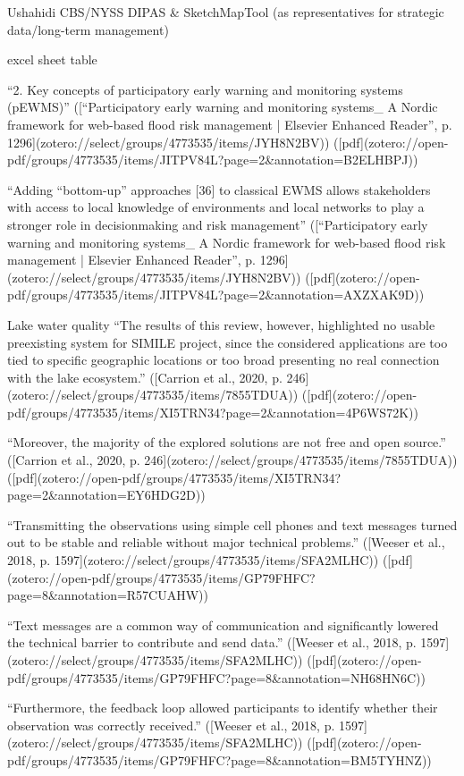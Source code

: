 {Ushahidi
CBS/NYSS
DIPAS \& SketchMapTool (as representatives for strategic data/long-term management)

excel sheet table

“2. Key concepts of participatory early warning and monitoring systems (pEWMS)” ([“Participatory early warning and monitoring systems_ A Nordic framework for web-based flood risk management | Elsevier Enhanced Reader”, p. 1296](zotero://select/groups/4773535/items/JYH8N2BV)) ([pdf](zotero://open-pdf/groups/4773535/items/JITPV84L?page=2&annotation=B2ELHBPJ))

“Adding “bottom-up” approaches [36] to classical EWMS allows stakeholders with access to local knowledge of environments and local networks to play a stronger role in decisionmaking and risk management” ([“Participatory early warning and monitoring systems_ A Nordic framework for web-based flood risk management | Elsevier Enhanced Reader”, p. 1296](zotero://select/groups/4773535/items/JYH8N2BV)) ([pdf](zotero://open-pdf/groups/4773535/items/JITPV84L?page=2&annotation=AXZXAK9D))

Lake water quality 
“The results of this review, however, highlighted no usable preexisting system for SIMILE project, since the considered applications are too tied to specific geographic locations or too broad presenting no real connection with the lake ecosystem.” ([Carrion et al., 2020, p. 246](zotero://select/groups/4773535/items/7855TDUA)) ([pdf](zotero://open-pdf/groups/4773535/items/XI5TRN34?page=2&annotation=4P6WS72K))

“Moreover, the majority of the explored solutions are not free and open source.” ([Carrion et al., 2020, p. 246](zotero://select/groups/4773535/items/7855TDUA)) ([pdf](zotero://open-pdf/groups/4773535/items/XI5TRN34?page=2&annotation=EY6HDG2D))

“Transmitting the observations using simple cell phones and text messages turned out to be stable and reliable without major technical problems.” ([Weeser et al., 2018, p. 1597](zotero://select/groups/4773535/items/SFA2MLHC)) ([pdf](zotero://open-pdf/groups/4773535/items/GP79FHFC?page=8&annotation=R57CUAHW))

“Text messages are a common way of communication and significantly lowered the technical barrier to contribute and send data.” ([Weeser et al., 2018, p. 1597](zotero://select/groups/4773535/items/SFA2MLHC)) ([pdf](zotero://open-pdf/groups/4773535/items/GP79FHFC?page=8&annotation=NH68HN6C))

“Furthermore, the feedback loop allowed participants to identify whether their observation was correctly received.” ([Weeser et al., 2018, p. 1597](zotero://select/groups/4773535/items/SFA2MLHC)) ([pdf](zotero://open-pdf/groups/4773535/items/GP79FHFC?page=8&annotation=BM5TYHNZ))

}
